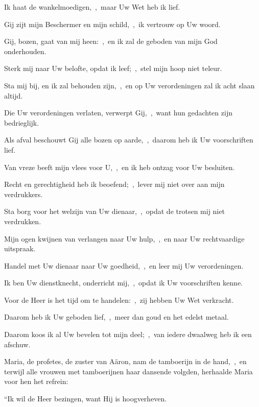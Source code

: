 \documentclass[12pt,twoside,a5paper]{article}
\begin{document}
\begin{halfparskip}
  Ik haat de wankelmoedigen,~\sep\ maar Uw Wet heb ik lief.


  Gij zijt mijn Beschermer en mijn schild,~\sep\ ik vertrouw op Uw woord.

  Gij, bozen, gaat van mij heen:~\sep\ en ik zal de geboden van mijn God onderhouden.

  Sterk mij naar Uw belofte, opdat ik leef;~\sep\ stel mijn hoop niet teleur.

  Sta mij bij, en ik zal behouden zijn,~\sep\ en op Uw verordeningen zal ik acht slaan altijd.

  Die Uw verordeningen verlaten, verwerpt Gij,~\sep\ want hun gedachten zijn bedrieglijk.

  Als afval beschouwt Gij alle bozen op aarde,~\sep\ daarom heb ik Uw voorschriften lief.

  Van vreze beeft mijn vlees voor U,~\sep\ en ik heb ontzag voor Uw besluiten.

  Recht en gerechtigheid heb ik beoefend;~\sep\ lever mij niet over aan mijn verdrukkers.

  Sta borg voor het welzijn van Uw dienaar,~\sep\ opdat de trotsen mij niet verdrukken.

  Mijn ogen kwijnen van verlangen naar Uw hulp,~\sep\ en naar Uw rechtvaardige uitspraak.

  Handel met Uw dienaar naar Uw goedheid,~\sep\ en leer mij Uw verordeningen.

  Ik ben Uw dienstknecht, onderricht mij,~\sep\ opdat ik Uw voorschriften kenne.

  Voor de Heer is het tijd om te handelen:~\sep\ zij hebben Uw Wet verkracht.

  Daarom heb ik Uw geboden lief,~\sep\ meer dan goud en het edelst metaal.

  Daarom koos ik al Uw bevelen tot mijn deel;~\sep\ van iedere dwaalweg heb ik een afschuw.
\end{halfparskip}


\begin{halfparskip}
  Maria, de profetes, de zuster van Aäron, nam de tamboerijn in de hand,~\sep\ en terwijl alle vrouwen met
  tamboerijnen haar dansende volgden, herhaalde Maria voor hen het refrein:


  ``Ik wil de Heer bezingen, want Hij is hoogverheven.
\end{halfparskip}
\end{document}
